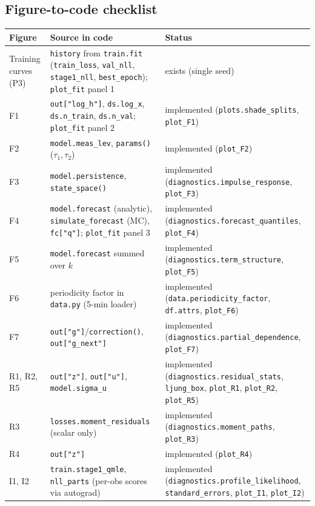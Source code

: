 \documentclass[11pt]{article}
\begin{document}
\subsection{Figure-to-code checklist}\label{sec:figs-check}
{\small
\begin{longtable}{p{3.2cm}p{8.4cm}p{2.6cm}}
\toprule
Figure & Source in code & Status\\
\midrule\endhead
Training curves (P3) & \texttt{history} from \texttt{train.fit} (\texttt{train\_loss}, \texttt{val\_nll}, \texttt{stage1\_nll}, \texttt{best\_epoch}); \texttt{plot\_fit} panel 1 & exists (single seed)\\
F1 & \texttt{out["log\_h"]}, \texttt{ds.log\_x}, \texttt{ds.n\_train}, \texttt{ds.n\_val}; \texttt{plot\_fit} panel 2 & implemented (\texttt{plots.shade\_splits}, \texttt{plot\_F1})\\
F2 & \texttt{model.meas\_lev}, \texttt{params()} ($\tau_1,\tau_2$) & implemented (\texttt{plot\_F2})\\
F3 & \texttt{model.persistence}, \texttt{state\_space()} & implemented (\texttt{diagnostics.impulse\_response}, \texttt{plot\_F3})\\
F4 & \texttt{model.forecast} (analytic), \texttt{simulate\_forecast} (MC), \texttt{fc["q"]}; \texttt{plot\_fit} panel 3 & implemented (\texttt{diagnostics.forecast\_quantiles}, \texttt{plot\_F4})\\
F5 & \texttt{model.forecast} summed over $k$ & implemented (\texttt{diagnostics.term\_structure}, \texttt{plot\_F5})\\
F6 & periodicity factor in \texttt{data.py} (5-min loader) & implemented (\texttt{data.periodicity\_factor}, \texttt{df.attrs}, \texttt{plot\_F6})\\
F7 & \texttt{out["g"]}/\texttt{correction()}, \texttt{out["g\_next"]} & implemented (\texttt{diagnostics.partial\_dependence}, \texttt{plot\_F7})\\
R1, R2, R5 & \texttt{out["z"]}, \texttt{out["u"]}, \texttt{model.sigma\_u} & implemented (\texttt{diagnostics.residual\_stats}, \texttt{ljung\_box}, \texttt{plot\_R1}, \texttt{plot\_R2}, \texttt{plot\_R5})\\
R3 & \texttt{losses.moment\_residuals} (scalar only) & implemented (\texttt{diagnostics.moment\_paths}, \texttt{plot\_R3})\\
R4 & \texttt{out["z"]} & implemented (\texttt{plot\_R4})\\
I1, I2 & \texttt{train.stage1\_qmle}, \texttt{nll\_parts} (per-obs scores via autograd) & implemented (\texttt{diagnostics.profile\_likelihood}, \texttt{standard\_errors}, \texttt{plot\_I1}, \texttt{plot\_I2})\\

\end{longtable}}
\end{document}
